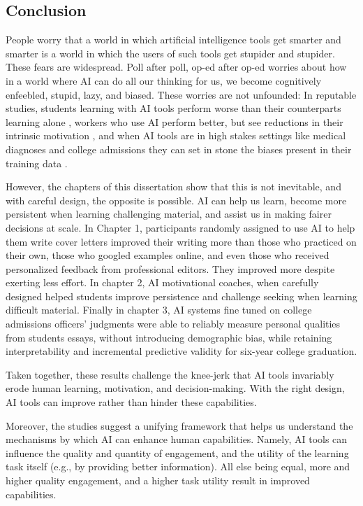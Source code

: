 \documentclass[11pt]{report}
\begin{document}
\begin{mainf}
\chapter{Conclusion}

People worry that a world in which artificial intelligence tools get smarter and smarter is a world in which the users of such tools get stupider and stupider. These fears are widespread. Poll after poll, op-ed after op-ed worries about how in a world where AI can do all our thinking for us, we become cognitively enfeebled, stupid, lazy, and biased. These worries are not unfounded: In reputable studies, students learning with AI tools perform worse than their counterparts learning alone \cite{sungu}, workers who use AI perform better, but see reductions in their intrinsic motivation \cite{}, and when AI tools are in high stakes settings like medical diagnoses and college admissions they can set in stone the biases present in their training data \cite{obermeyer_dissecting_2019, alvero_essay_2021}.

However, the chapters of this dissertation show that this is not inevitable, and with careful design, the opposite is possible. AI can help us learn, become more persistent when learning challenging material, and assist us in making fairer decisions at scale. In Chapter 1, participants randomly assigned to use AI to help them write cover letters improved their writing more than those who practiced on their own, those who googled examples online, and even those who received personalized feedback from professional editors. They improved more despite exerting less effort. In chapter 2, AI motivational coaches, when carefully designed helped students improve persistence and challenge seeking when learning difficult material. Finally in chapter 3, AI systems fine tuned on college admissions officers' judgments were able to reliably measure personal qualities from students essays, without introducing demographic bias, while retaining interpretability and incremental predictive validity for six-year college graduation.

Taken together, these results challenge the knee-jerk that AI tools invariably erode human learning, motivation, and decision-making. With the right design, AI tools can improve rather than hinder these capabilities.

Moreover, the studies suggest a unifying framework that helps us understand the mechanisms by which AI can enhance human capabilities. Namely, AI tools can influence the quality and quantity of engagement, and the utility of the learning task itself (e.g., by providing better information). All else being equal, more and higher quality engagement, and a higher task utility result in improved capabilities. 


\end{mainf}
\end{document}
